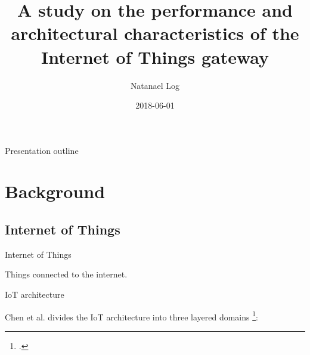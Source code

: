 \documentclass{beamer}
\title{A study on the performance and architectural characteristics of the
Internet of Things gateway}
\author{Natanael Log}
\institute{Master's thesis, spring 2018}
\date{2018-06-01}
\begin{document}
    \begin{frame}
        \titlepage
    \end{frame}

    \begin{frame}{Presentation outline}
        \tableofcontents
    \end{frame}

    \section{Background}

    \subsection{Internet of Things}

    \begin{frame}{Internet of Things}

        Things connected to the internet.

    \end{frame}

%
%
%

    \begin{frame}{IoT architecture}

        Chen et al. divides the IoT architecture into three layered domains
        \footcite{chen2011brief}:

        \begin{figure}[h!]
            \centering
        \end{figure}

    \end{frame}
\end{document}

